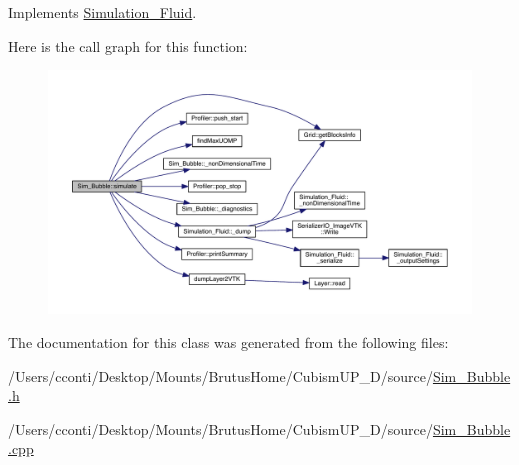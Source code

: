 Implements \hyperlink{class_simulation___fluid_a81e2754617245ce69346272181a5de78}{Simulation\+\_\+\+Fluid}.



Here is the call graph for this function\+:
\nopagebreak
\begin{figure}[H]
\begin{center}
\leavevmode
\includegraphics[width=350pt]{d1/d16/class_sim___bubble_a80010a9aaf2c9dc9320adfbb23e40344_cgraph}
\end{center}
\end{figure}




The documentation for this class was generated from the following files\+:\begin{DoxyCompactItemize}
\item 
/\+Users/cconti/\+Desktop/\+Mounts/\+Brutus\+Home/\+Cubism\+U\+P\+\_\+D/source/\hyperlink{_sim___bubble_8h}{Sim\+\_\+\+Bubble.\+h}\item 
/\+Users/cconti/\+Desktop/\+Mounts/\+Brutus\+Home/\+Cubism\+U\+P\+\_\+D/source/\hyperlink{_sim___bubble_8cpp}{Sim\+\_\+\+Bubble.\+cpp}\end{DoxyCompactItemize}
